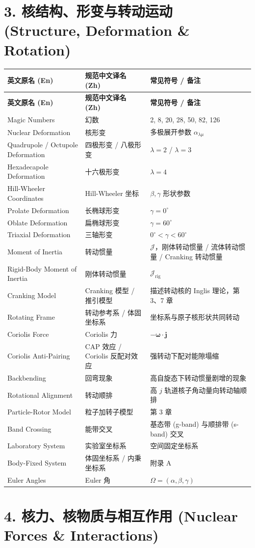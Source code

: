 \section*{3. 核结构、形变与转动运动 (Structure, Deformation \& Rotation)}

\begin{longtable}{p{4.8cm} p{4.8cm} p{5.0cm}}
\toprule
\textbf{英文原名 (En)} & \textbf{规范中文译名 (Zh)} & \textbf{常见符号 / 备注} \tabularnewline
\midrule
\endfirsthead
\toprule
\textbf{英文原名 (En)} & \textbf{规范中文译名 (Zh)} & \textbf{常见符号 / 备注} \tabularnewline
\midrule
\endhead
\bottomrule
\endfoot
\bottomrule
\endlastfoot
Magic Numbers & 幻数 & 2, 8, 20, 28, 50, 82, 126 \tabularnewline
Nuclear Deformation & 核形变 & 多极展开参数 $\alpha_{\lambda\mu}$ \tabularnewline
Quadrupole / Octupole Deformation & 四极形变 / 八极形变 & $\lambda=2$ / $\lambda=3$ \tabularnewline
Hexadecapole Deformation & 十六极形变 & $\lambda=4$ \tabularnewline
Hill-Wheeler Coordinates & Hill-Wheeler 坐标 & $\beta, \gamma$ 形状参数 \tabularnewline
Prolate Deformation & 长椭球形变 & $\gamma = 0^\circ$ \tabularnewline
Oblate Deformation & 扁椭球形变 & $\gamma = 60^\circ$ \tabularnewline
Triaxial Deformation & 三轴形变 & $0^\circ < \gamma < 60^\circ$ \tabularnewline
Moment of Inertia & 转动惯量 & $\mathcal{J}$，刚体转动惯量 / 流体转动惯量 / Cranking 转动惯量 \tabularnewline
Rigid-Body Moment of Inertia & 刚体转动惯量 & $\mathcal{J}_{\text{rig}}$ \tabularnewline
Cranking Model & Cranking 模型 / 推引模型 & 描述转动核的 Inglis 理论，第 3、7 章 \tabularnewline
Rotating Frame & 转动参考系 / 体固坐标系 & 坐标系与原子核形状共同转动 \tabularnewline
Coriolis Force & Coriolis 力 & $-\boldsymbol{\omega} \cdot \boldsymbol{j}$ \tabularnewline
Coriolis Anti-Pairing & CAP 效应 / Coriolis 反配对效应 & 强转动下配对能隙塌缩 \tabularnewline
Backbending & 回弯现象 & 高自旋态下转动惯量剧增的现象 \tabularnewline
Rotational Alignment & 转动顺排 & 高 $j$ 轨道核子角动量向转动轴顺排 \tabularnewline
Particle-Rotor Model & 粒子加转子模型 & 第 3 章 \tabularnewline
Band Crossing & 能带交叉 & 基态带 (g-band) 与顺排带 (s-band) 交叉 \tabularnewline
Laboratory System & 实验室坐标系 & 空间固定坐标系 \tabularnewline
Body-Fixed System & 体固坐标系 / 内秉坐标系 & 附录 A \tabularnewline
Euler Angles & Euler 角 & $\Omega = (\alpha, \beta, \gamma)$ \tabularnewline
\end{longtable}

\section*{4. 核力、核物质与相互作用 (Nuclear Forces \& Interactions)}

